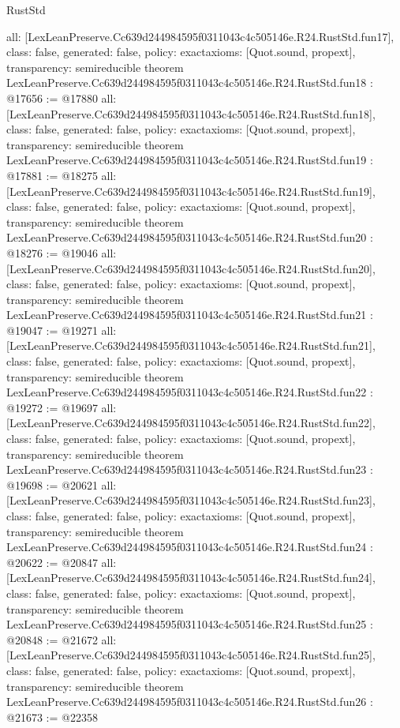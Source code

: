 \begin{lexlean}{RustStd}
\begin{coremodule}
{  all: [LexLeanPreserve.Cc639d244984595f0311043c4c505146e.R24.RustStd.fun17],
  class: false,
  generated: false,
  policy: exact{axioms: [Quot.sound, propext]},
  transparency: semireducible
}
theorem LexLeanPreserve.Cc639d244984595f0311043c4c505146e.R24.RustStd.fun18 : @17656 := @17880 {
  all: [LexLeanPreserve.Cc639d244984595f0311043c4c505146e.R24.RustStd.fun18],
  class: false,
  generated: false,
  policy: exact{axioms: [Quot.sound, propext]},
  transparency: semireducible
}
theorem LexLeanPreserve.Cc639d244984595f0311043c4c505146e.R24.RustStd.fun19 : @17881 := @18275 {
  all: [LexLeanPreserve.Cc639d244984595f0311043c4c505146e.R24.RustStd.fun19],
  class: false,
  generated: false,
  policy: exact{axioms: [Quot.sound, propext]},
  transparency: semireducible
}
theorem LexLeanPreserve.Cc639d244984595f0311043c4c505146e.R24.RustStd.fun20 : @18276 := @19046 {
  all: [LexLeanPreserve.Cc639d244984595f0311043c4c505146e.R24.RustStd.fun20],
  class: false,
  generated: false,
  policy: exact{axioms: [Quot.sound, propext]},
  transparency: semireducible
}
theorem LexLeanPreserve.Cc639d244984595f0311043c4c505146e.R24.RustStd.fun21 : @19047 := @19271 {
  all: [LexLeanPreserve.Cc639d244984595f0311043c4c505146e.R24.RustStd.fun21],
  class: false,
  generated: false,
  policy: exact{axioms: [Quot.sound, propext]},
  transparency: semireducible
}
theorem LexLeanPreserve.Cc639d244984595f0311043c4c505146e.R24.RustStd.fun22 : @19272 := @19697 {
  all: [LexLeanPreserve.Cc639d244984595f0311043c4c505146e.R24.RustStd.fun22],
  class: false,
  generated: false,
  policy: exact{axioms: [Quot.sound, propext]},
  transparency: semireducible
}
theorem LexLeanPreserve.Cc639d244984595f0311043c4c505146e.R24.RustStd.fun23 : @19698 := @20621 {
  all: [LexLeanPreserve.Cc639d244984595f0311043c4c505146e.R24.RustStd.fun23],
  class: false,
  generated: false,
  policy: exact{axioms: [Quot.sound, propext]},
  transparency: semireducible
}
theorem LexLeanPreserve.Cc639d244984595f0311043c4c505146e.R24.RustStd.fun24 : @20622 := @20847 {
  all: [LexLeanPreserve.Cc639d244984595f0311043c4c505146e.R24.RustStd.fun24],
  class: false,
  generated: false,
  policy: exact{axioms: [Quot.sound, propext]},
  transparency: semireducible
}
theorem LexLeanPreserve.Cc639d244984595f0311043c4c505146e.R24.RustStd.fun25 : @20848 := @21672 {
  all: [LexLeanPreserve.Cc639d244984595f0311043c4c505146e.R24.RustStd.fun25],
  class: false,
  generated: false,
  policy: exact{axioms: [Quot.sound, propext]},
  transparency: semireducible
}
theorem LexLeanPreserve.Cc639d244984595f0311043c4c505146e.R24.RustStd.fun26 : @21673 := @22358 {
}
\end{coremodule}
\end{lexlean}
